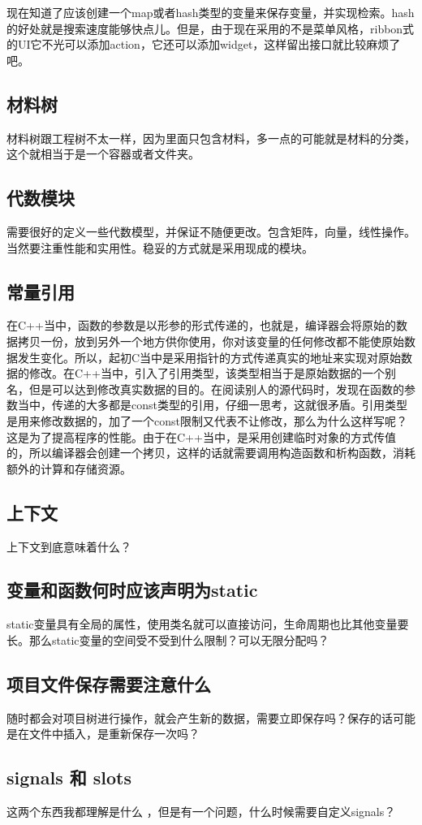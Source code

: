 现在知道了应该创建一个map或者hash类型的变量来保存变量，并实现检索。hash的好处就是搜索速度能够快点儿。但是，由于现在采用的不是菜单风格，ribbon式的UI它不光可以添加action，它还可以添加widget，这样留出接口就比较麻烦了吧。
\subsection{材料树}
材料树跟工程树不太一样，因为里面只包含材料，多一点的可能就是材料的分类，这个就相当于是一个容器或者文件夹。
\subsection{代数模块}
需要很好的定义一些代数模型，并保证不随便更改。包含矩阵，向量，线性操作。当然要注重性能和实用性。稳妥的方式就是采用现成的模块。
\subsection{常量引用}
在C++当中，函数的参数是以形参的形式传递的，也就是，编译器会将原始的数据拷贝一份，放到另外一个地方供你使用，你对该变量的任何修改都不能使原始数据发生变化。所以，起初C当中是采用指针的方式传递真实的地址来实现对原始数据的修改。在C++当中，引入了引用类型，该类型相当于是原始数据的一个别名，但是可以达到修改真实数据的目的。在阅读别人的源代码时，发现在函数的参数当中，传递的大多都是const类型的引用，仔细一思考，这就很矛盾。引用类型是用来修改数据的，加了一个const限制又代表不让修改，那么为什么这样写呢？这是为了提高程序的性能。由于在C++当中，是采用创建临时对象的方式传值的，所以编译器会创建一个拷贝，这样的话就需要调用构造函数和析构函数，消耗额外的计算和存储资源。
\subsection{上下文}
上下文到底意味着什么？
\subsection{变量和函数何时应该声明为static}
static变量具有全局的属性，使用类名就可以直接访问，生命周期也比其他变量要长。那么static变量的空间受不受到什么限制？可以无限分配吗？
\subsection{项目文件保存需要注意什么}
随时都会对项目树进行操作，就会产生新的数据，需要立即保存吗？保存的话可能是在文件中插入，是重新保存一次吗？
\subsection{signals 和 slots}
这两个东西我都理解是什么 ，但是有一个问题，什么时候需要自定义signals？
